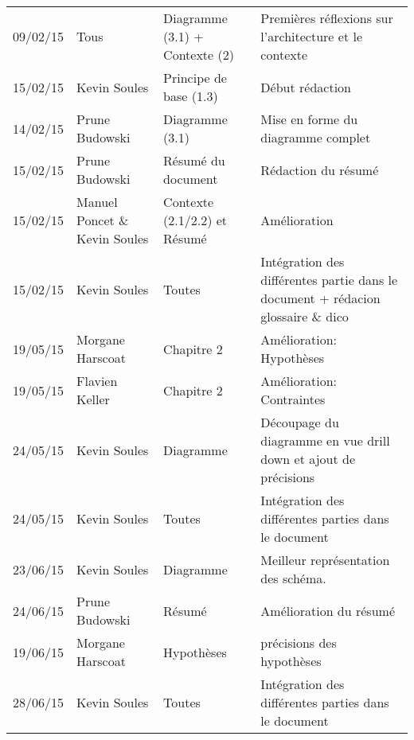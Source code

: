 \small
\begin{tabular}{|p{1.5cm}| >{\raggedright}p{2.9cm}| >{\raggedright}p{3.2cm}|p{7.2cm}|}
  \hline
  \rowcolor{Gainsboro} \color{Navy}{\bfseries Date}  & \color{Navy}{\bfseries Auteur} & \color{Navy}{\bfseries Section(s)}  &\color{Navy}{\bfseries Commentaires} \\
  \hline
  09/02/15 & Tous & Diagramme (3.1) + Contexte (2) & Premières réflexions sur l'architecture et le contexte\\
  \hline
  15/02/15 & Kevin Soules & Principe de base (1.3)  & Début rédaction\\
  \hline
  14/02/15 & Prune Budowski & Diagramme (3.1) & Mise en forme du diagramme complet\\
  \hline
  15/02/15 & Prune Budowski & Résumé du document & Rédaction du résumé\\
  \hline
  15/02/15 & Manuel Poncet \& Kevin Soules & Contexte (2.1/2.2) et Résumé & Amélioration\\
  \hline
  15/02/15 & Kevin Soules & Toutes & Intégration des différentes partie dans le document + rédacion glossaire \& dico\\
  \hline
  19/05/15 & Morgane Harscoat & Chapitre 2  & Amélioration: Hypothèses \\
  \hline
  19/05/15 & Flavien Keller & Chapitre 2 & Amélioration: Contraintes \\
  \hline
  24/05/15 & Kevin Soules & Diagramme  & Découpage du diagramme en vue drill down et ajout de précisions\\
  \hline
  24/05/15 & Kevin Soules & Toutes & Intégration des différentes parties dans le document\\
  \hline
  23/06/15 & Kevin Soules & Diagramme & Meilleur représentation des schéma.\\
  \hline
  24/06/15 & Prune Budowski & Résumé & Amélioration du résumé\\
  \hline
  19/06/15 & Morgane Harscoat & Hypothèses & précisions des hypothèses \\
  \hline
  28/06/15 & Kevin Soules & Toutes & Intégration des différentes parties dans le document\\
  \hline
\end{tabular}
\normalsize
